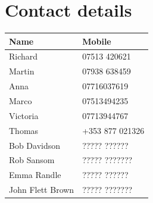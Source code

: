 \documentclass[12pt,letterpaper]{article}
\begin{document}
\section{Contact details}

\begin{table}[!htpb]
\centering
\begin{tabular}{l l}
	\textbf{Name} & \textbf{Mobile}\\
	\hline

	Richard & 07513 420621 \\
	Martin & 07938 638459 \\
	Anna & 07716037619 \\
	Marco & 07513494235 \\
	Victoria & 07713944767 \\
	Thomas &  +353 877 021326 \\
	Bob Davidson & ????? ?????? \\
	Rob Sansom & ????? ??????? \\
	Emma Randle & ????? ?????? \\
	John Flett Brown & ????? ??????? \\


\end{tabular} \\
\end{table}

\pagebreak

\end{document}
